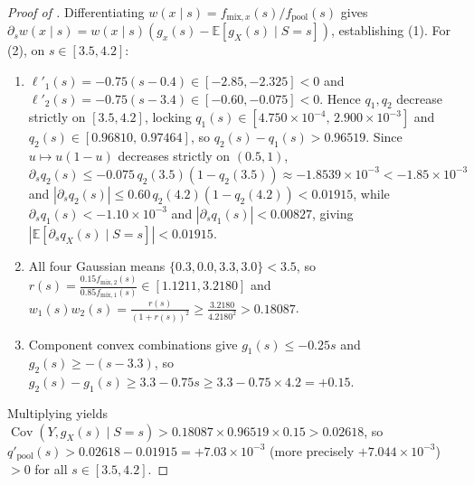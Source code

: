 \documentclass[10pt]{article}
\theoremstyle{plain}
\theoremstyle{definition}
\theoremstyle{remark}
\newcommand{\E}{\mathbb{E}}
\newcommand{\Cov}{\operatorname{Cov}}
\begin{document}
\begin{proof}[Proof of ]
Differentiating $w(x\mid s) = f_{\mathrm{mix},x}(s)/f_{\mathrm{pool}}(s)$ gives $\partial_s w(x\mid s) = w(x\mid s)(g_x(s) - \E[g_X(s)\mid S=s])$, establishing (1). For (2), on $s \in [3.5, 4.2]$:
\begin{enumerate}[leftmargin=1.8em,itemsep=2pt]
    \item $\ell'_1(s) = -0.75(s - 0.4) \in [-2.85, -2.325] < 0$ and $\ell'_2(s) = -0.75(s - 3.4) \in [-0.60, -0.075] < 0$. Hence $q_1, q_2$ decrease strictly on $[3.5, 4.2]$, locking $q_1(s) \in [4.750\times 10^{-4},\, 2.900\times 10^{-3}]$ and $q_2(s) \in [0.96810,\, 0.97464]$, so $q_2(s) - q_1(s) > 0.96519$. Since $u \mapsto u(1-u)$ decreases strictly on $(0.5, 1)$, $\partial_s q_2(s) \le -0.075\, q_2(3.5)(1-q_2(3.5)) \approx -1.8539\times 10^{-3} < -1.85\times 10^{-3}$ and $|\partial_s q_2(s)| \le 0.60\, q_2(4.2)(1-q_2(4.2)) < 0.01915$, while $\partial_s q_1(s) < -1.10\times 10^{-3}$ and $|\partial_s q_1(s)| < 0.00827$, giving $|\E[\partial_s q_X(s)\mid S=s]| < 0.01915$.
    \item All four Gaussian means $\{0.3, 0.0, 3.3, 3.0\} < 3.5$, so $r(s) = \frac{0.15 f_{\mathrm{mix},2}(s)}{0.85 f_{\mathrm{mix},1}(s)} \in [1.1211, 3.2180]$ and $w_1(s)w_2(s) = \frac{r(s)}{(1+r(s))^2} \ge \frac{3.2180}{4.2180^2} > 0.18087$.
    \item Component convex combinations give $g_1(s) \le -0.25 s$ and $g_2(s) \ge -(s - 3.3)$, so $g_2(s) - g_1(s) \ge 3.3 - 0.75 s \ge 3.3 - 0.75\times 4.2 = +0.15$.
\end{enumerate}
Multiplying yields $\Cov(Y, g_X(s)\mid S=s) > 0.18087\times 0.96519\times 0.15 > 0.02618$, so $q'_{\mathrm{pool}}(s) > 0.02618 - 0.01915 = +7.03\times 10^{-3}$ (more precisely $+7.044\times 10^{-3}$) $> 0$ for all $s \in [3.5, 4.2]$.
\end{proof}
\end{document}
